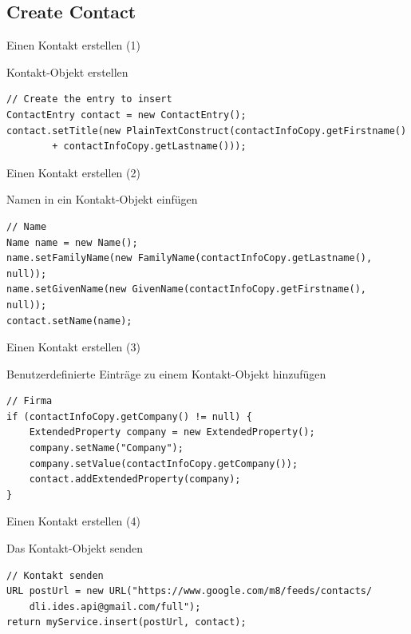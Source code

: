 \subsection*{Create Contact}

\begin{frame}[fragile]{Einen Kontakt erstellen (1)}
\begin{block}{Kontakt-Objekt erstellen}
\javalstset
\begin{lstlisting}
// Create the entry to insert
ContactEntry contact = new ContactEntry();
contact.setTitle(new PlainTextConstruct(contactInfoCopy.getFirstname()
		+ contactInfoCopy.getLastname()));
\end{lstlisting}
\end{block}
\end{frame}

\begin{frame}[fragile]{Einen Kontakt erstellen (2)}
\begin{block}{Namen in ein Kontakt-Objekt einfügen}
\javalstset
\begin{lstlisting}
// Name
Name name = new Name();
name.setFamilyName(new FamilyName(contactInfoCopy.getLastname(), null));
name.setGivenName(new GivenName(contactInfoCopy.getFirstname(), null));
contact.setName(name);
\end{lstlisting}
\end{block}
\end{frame}

\begin{frame}[fragile]{Einen Kontakt erstellen (3)}
\begin{block}{Benutzerdefinierte Einträge zu einem Kontakt-Objekt hinzufügen}
\javalstset
\begin{lstlisting}	
// Firma
if (contactInfoCopy.getCompany() != null) {
	ExtendedProperty company = new ExtendedProperty();
	company.setName("Company");
	company.setValue(contactInfoCopy.getCompany());
	contact.addExtendedProperty(company);
}
\end{lstlisting}
\end{block}
\end{frame}

\begin{frame}[fragile]{Einen Kontakt erstellen (4)}
\begin{block}{Das Kontakt-Objekt senden}
\javalstset
\begin{lstlisting}
// Kontakt senden		
URL postUrl = new URL("https://www.google.com/m8/feeds/contacts/
	dli.ides.api@gmail.com/full");
return myService.insert(postUrl, contact);
\end{lstlisting}
\end{block}
\end{frame}


